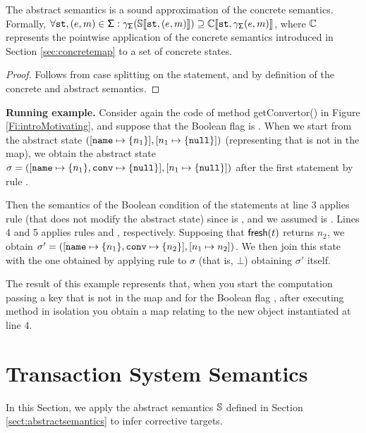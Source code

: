 \begin{lemma}
	\label{lemma:soundnessabstractsemantics}
	The abstract semantics is a sound approximation of the concrete semantics. Formally, $\forall \mathtt{st}, (e, m) \in \mathsf{\Sigma}: \gamma_{\mathsf{\Sigma}}(\mathbb{S}\llbracket \mathtt{st}, (e, m) \rrbracket) \supseteq \mathbb{C}\llbracket \mathtt{st}, \gamma_{\mathsf{\Sigma}}(e, m) \rrbracket$, where $\mathbb{C}$ represents the pointwise application of the concrete semantics introduced in Section \ref{sec:concretemap} to a set of concrete states.
\end{lemma}
\begin{proof}
Follows from case splitting on the statement, and by definition of the concrete and abstract semantics.
\end{proof}

\noindent \textbf{Running example.}
Consider again the code of method {\sf getConvertor()} in Figure \ref{Fi:introMotivating}, and suppose that the Boolean flag  is . When we start from the abstract state  $([\mathtt{name} \mapsto \{n_1\}], [n_1 \mapsto \{\mathtt{null}\}])$ (representing that  is not in the map), we obtain the abstract state $\sigma = ([\mathtt{name} \mapsto \{n_1\}, \mathtt{conv} \mapsto \{\mathtt{null}\}], [n_1 \mapsto \{\mathtt{null}\}])$ after the first statement by rule . 

Then the semantics of the Boolean condition of the  statements at line 3 applies rule  (that does not modify the abstract state) since  is , and we assumed  is . 
Lines 4 and 5 applies rules  and , respectively. Supposing that $\mathsf{fresh}(t)$ returns $n_2$, we obtain $\sigma'=([\mathtt{name} \mapsto \{n_1\}, \mathtt{conv} \mapsto \{n_2\}], [n_1 \mapsto n_2])$. We then join this state with the one obtained by applying rule  to $\sigma$ (that is, $\bot$) obtaining $\sigma'$ itself.

The result of this example represents that, when you start the computation passing a key  that is not in the map and  for the Boolean flag , after executing method  in isolation you obtain a map relating  to the new object instantiated at line 4.

\section{Transaction System Semantics}
\label{sec:transactionsystemwarping}
In this Section, we apply the abstract semantics $\mathbb{S}$ defined in Section \ref{sect:abstractsemantics} to infer corrective targets.

